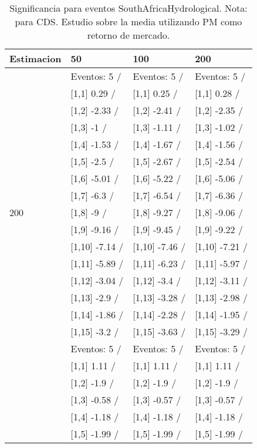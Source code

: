 \begin{table}

\caption{Significancia para eventos SouthAfricaHydrological. Nota: para CDS. Estudio sobre la media utilizando PM como retorno de mercado.}
\centering
\begin{tabular}[t]{llll}
\toprule
Estimacion & 50 & 100 & 200\\
\midrule
 & Eventos:  5 / & Eventos:  5 / & Eventos:  5 /\\
 & {}[1,1] 0.29  / & {}[1,1] 0.25  / & {}[1,1] 0.28  /\\
 & {}[1,2] -2.33  / & {}[1,2] -2.41  / & {}[1,2] -2.35  /\\
 & {}[1,3] -1  / & {}[1,3] -1.11  / & {}[1,3] -1.02  /\\
 & {}[1,4] -1.53  / & {}[1,4] -1.67  / & {}[1,4] -1.56  /\\
\addlinespace
 & {}[1,5] -2.5  / & {}[1,5] -2.67  / & {}[1,5] -2.54  /\\
 & {}[1,6] -5.01  / & {}[1,6] -5.22  / & {}[1,6] -5.06  /\\
 & {}[1,7] -6.3  / & {}[1,7] -6.54  / & {}[1,7] -6.36  /\\
200 & {}[1,8] -9  / & {}[1,8] -9.27  / & {}[1,8] -9.06  /\\
 & {}[1,9] -9.16  / & {}[1,9] -9.45  / & {}[1,9] -9.22  /\\
\addlinespace
 & {}[1,10] -7.14  / & {}[1,10] -7.46  / & {}[1,10] -7.21  /\\
 & {}[1,11] -5.89  / & {}[1,11] -6.23  / & {}[1,11] -5.97  /\\
 & {}[1,12] -3.04  / & {}[1,12] -3.4  / & {}[1,12] -3.11  /\\
 & {}[1,13] -2.9  / & {}[1,13] -3.28  / & {}[1,13] -2.98  /\\
 & {}[1,14] -1.86  / & {}[1,14] -2.28  / & {}[1,14] -1.95  /\\
\addlinespace
 & {}[1,15] -3.2  / & {}[1,15] -3.63  / & {}[1,15] -3.29  /\\
 & Eventos:  5 / & Eventos:  5 / & Eventos:  5 /\\
 & {}[1,1] 1.11  / & {}[1,1] 1.11  / & {}[1,1] 1.11  /\\
 & {}[1,2] -1.9  / & {}[1,2] -1.9  / & {}[1,2] -1.9  /\\
 & {}[1,3] -0.58  / & {}[1,3] -0.57  / & {}[1,3] -0.57  /\\
\addlinespace
 & {}[1,4] -1.18  / & {}[1,4] -1.18  / & {}[1,4] -1.18  /\\
 & {}[1,5] -1.99  / & {}[1,5] -1.99  / & {}[1,5] -1.99  /\\

\end{tabular}
\end{table}
